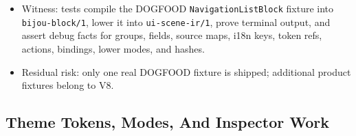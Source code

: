 \begin{itemize}
\item
  Witness: tests compile the DOGFOOD \texttt{N\allowbreak{}a\allowbreak{}v\allowbreak{}i\allowbreak{}g\allowbreak{}a\allowbreak{}t\allowbreak{}i\allowbreak{}o\allowbreak{}n\allowbreak{}L\allowbreak{}i\allowbreak{}s\allowbreak{}t\allowbreak{}B\allowbreak{}l\allowbreak{}o\allowbreak{}c\allowbreak{}k} fixture into \texttt{b\allowbreak{}i\allowbreak{}j\allowbreak{}o\allowbreak{}u\allowbreak{}-\allowbreak{}b\allowbreak{}l\allowbreak{}o\allowbreak{}c\allowbreak{}k\allowbreak{}/\allowbreak{}1}, lower it into \texttt{u\allowbreak{}i\allowbreak{}-\allowbreak{}s\allowbreak{}c\allowbreak{}e\allowbreak{}n\allowbreak{}e\allowbreak{}-\allowbreak{}i\allowbreak{}r\allowbreak{}/\allowbreak{}1}, prove terminal output, and assert debug facts for groups, fields, source maps, i18n keys, token refs, actions, bindings, lower modes, and hashes.
\item
  Residual risk: only one real DOGFOOD fixture is shipped; additional product fixtures belong to V8.
\end{itemize}

\subsection{Theme Tokens, Modes, And Inspector Work}\label{record-260-theme-tokens-modes-and-inspector-work}

